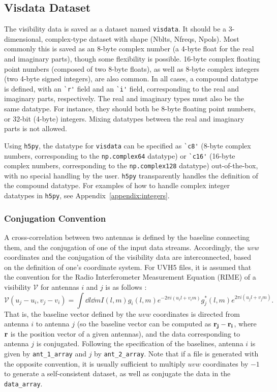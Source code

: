 \documentclass[11pt, oneside]{article}
\begin{document}
\subsection{Visdata Dataset}
\label{sec:visdata}
The visibility data is saved as a dataset named \verb+visdata+. It should be a
3-dimensional, complex-type dataset with shape (Nblts, Nfreqs, Npols). Most
commonly this is saved as an 8-byte complex number (a 4-byte float for the real
and imaginary parts), though some flexibility is possible. 16-byte complex
floating point numbers (composed of two 8-byte floats), as well as 8-byte
complex integers (two 4-byte signed integers), are also common. In all cases, a
compound datatype is defined, with an \verb+`r'+ field and an \verb+`i'+ field,
corresponding to the real and imaginary parts, respectively. The real and
imaginary types must also be the same datatype. For instance, they should both
be 8-byte floating point numbers, or 32-bit (4-byte) integers. Mixing datatypes
between the real and imaginary parts is not allowed.

Using \verb+h5py+, the datatype for \verb+visdata+ can be specified as
\verb+`c8'+ (8-byte complex numbers, corresponding to the \verb+np.complex64+
datatype) or \verb+`c16'+ (16-byte complex numbers, corresponding to the
\verb+np.complex128+ datatype) out-of-the-box, with no special handling by the
user. \verb+h5py+ transparently handles the definition of the compound
datatype. For examples of how to handle complex integer datatypes in
\verb+h5py+, see Appendix~\ref{appendix:integers}.

\subsubsection{Conjugation Convention}
A cross-correlation between two antennas is defined by the baseline connecting
them, and the conjugation of one of the input data streams. Accordingly, the
\textit{uvw} coordinates and the conjugation of the visibility data are
interconnected, based on the definition of one's coordinate system. For UVH5
files, it is assumed that the convention for the Radio Interferometer
Measurement Equation (RIME) of a visibility $\mathcal{V}$ for antennas $i$ and
$j$ is as follows \cite{tms}:
\begin{equation}
\mathcal{V}(u_j - u_i, v_j - v_i) = \int \dd{l} \dd{m} I(l, m) g_i(l, m) e^{-2\pi i (u_i l + v_i m)} g_j^*(l, m) e^{2\pi i (u_j l + v_j m)}.
\end{equation}
That is, the baseline vector defined by the $uvw$ coordinates is directed from
antenna $i$ to antenna $j$ (so the baseline vector can be computed as
$\vb{r_j} - \vb{r_i}$, where $\vb{r}$ is the position vector of a given
antennas), and the data corresponding to antenna $j$ is conjugated. Following
the specification of the baselines, antenna $i$ is given by \verb+ant_1_array+
and $j$ by \verb+ant_2_array+. Note that if a file is generated with the opposite
convention, it is usually sufficient to multiply $uvw$ coordinates by $-1$ to
generate a self-consistent dataset, as well as conjugate the data in the
\verb+data_array+.
\end{document}
